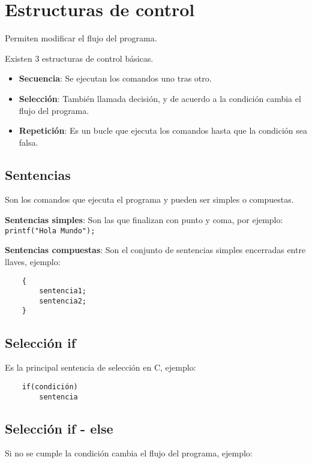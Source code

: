 \chapter[Estructuras de control]{Estructuras de control}
\raggedright
Permiten modificar el flujo del programa.

\vspace{1em}
Existen 3 estructuras de control básicas.

\vspace{1em}
\begin{itemize}
	\item \textbf{Secuencia}: Se ejecutan los comandos uno tras otro.
	\item \textbf{Selección}: También llamada decisión, y de acuerdo a la condición cambia el flujo del programa.
	\item \textbf{Repetición}: Es un bucle que ejecuta los comandos hasta que la condición sea falsa.
\end{itemize}

\section [Sentencias]{Sentencias}
Son los comandos que ejecuta el programa y pueden ser simples o compuestas.


\vspace{1em}
{\textbf{Sentencias simples}: Son las que finalizan con punto y coma, por ejemplo: \verb|printf("Hola Mundo");|}

\vspace{1em}
{\textbf{Sentencias compuestas}: Son el conjunto de sentencias simples encerradas entre llaves, ejemplo:}

\begin{verbatim}
	{
		sentencia1;
		sentencia2;
	}
\end{verbatim}	


\section [Selección if]{Selección if}
Es la principal sentencia de selección en C, ejemplo:

\begin{verbatim}
	if(condición)
		sentencia
\end{verbatim}

\section [Selección if - else]{Selección if - else}
Si no se cumple la condición cambia el flujo del programa, ejemplo:

